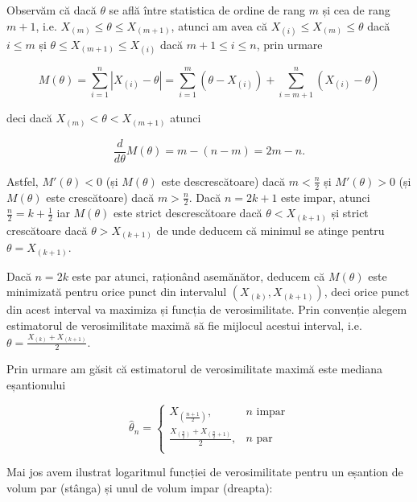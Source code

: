 \documentclass[]{article}
\begin{document}
Observăm că dacă \(\theta\) se află între statistica de ordine de rang
\(m\) și cea de rang \(m+1\), i.e. \(X_{(m)}\leq \theta\leq X_{(m+1)}\),
atunci am avea că \(X_{(i)} \leq X_{(m)} \leq \theta\) dacă \(i\leq m\)
și \(\theta\leq X_{(m+1)}\leq X_{(i)}\) dacă \(m+1\leq i\leq n\), prin
urmare

\[
M(\theta) = \sum_{i=1}^{n}|X_{(i)}-\theta| = \sum_{i=1}^{m}(\theta - X_{(i)}) + \sum_{i=m+1}^{n}(X_{(i)}-\theta)
\]

deci dacă \(X_{(m)}< \theta< X_{(m+1)}\) atunci

\[
\frac{d}{d\theta}M(\theta) = m - (n-m) = 2m-n.
\]

Astfel, \(M'(\theta)<0\) (și \(M(\theta)\) este descrescătoare) dacă
\(m<\frac{n}{2}\) și \(M'(\theta)>0\) (și \(M(\theta)\) este
crescătoare) dacă \(m>\frac{n}{2}\). Dacă \(n = 2k+1\) este impar,
atunci \(\frac{n}{2} = k +\frac{1}{2}\) iar \(M(\theta)\) este strict
descrescătoare dacă \(\theta<X_{(k+1)}\) și strict crescătoare dacă
\(\theta>X_{(k+1)}\) de unde deducem că minimul se atinge pentru
\(\theta = X_{(k+1)}\).

Dacă \(n = 2k\) este par atunci, raționând asemănător, deducem că
\(M(\theta)\) este minimizată pentru orice punct din intervalul
\((X_{(k)}, X_{(k+1)})\), deci orice punct din acest interval va
maximiza și funcția de verosimilitate. Prin convenție alegem estimatorul
de verosimilitate maximă să fie mijlocul acestui interval, i.e.
\(\theta = \frac{X_{(k)} + X_{(k+1)}}{2}\).

Prin urmare am găsit că estimatorul de verosimilitate maximă este
mediana eșantionului

\[
\hat{\theta}_n = \left\{\begin{array}{ll}
  X_{\left(\frac{n+1}{2}\right)}, & \text{$n$ impar}\\
  \frac{X_{\left(\frac{n}{2}\right)} + X_{\left(\frac{n}{2}+1\right)}}{2}, & \text{$n$ par}\\
\end{array}\right.
\]

Mai jos avem ilustrat logaritmul funcției de verosimilitate pentru un
eșantion de volum par (stânga) și unul de volum impar (dreapta):
\end{document}
